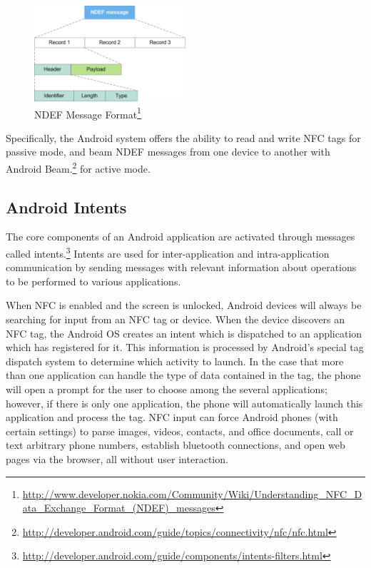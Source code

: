 \documentclass[12pt]{article}
\begin{document}
\begin{figure}[h!]
\begin{minipage}{\textwidth}
	\centering
		\includegraphics[width=0.5\textwidth]{NDEF_Format.png}
	\caption[Caption for LOF]%
		{NDEF Message Format\footnote{\url{http://www.developer.nokia.com/Community/Wiki/Understanding_NFC_Data_Exchange_Format_(NDEF)_messages}}}

\end{minipage} 
\end{figure}

Specifically, the Android system offers the ability to read and write NFC tags for passive mode, and beam NDEF messages from one device to another with Android Beam.\footnote{\url{http://developer.android.com/guide/topics/connectivity/nfc/nfc.html}} for active mode. 

\subsection{Android Intents}
The core components of an Android application are activated through messages called intents.\footnote{\url{http://developer.android.com/guide/components/intents-filters.html}}
Intents are used for inter-application and intra-application communication by sending messages with relevant information about operations to be performed to various applications.  

When NFC is enabled and the screen is unlocked, Android devices will always be searching for input from an NFC tag or device. 
When the device discovers an NFC tag, the Android OS creates an intent which is dispatched to an application which has registered for it.
This information is processed by Android's special tag dispatch system to determine which activity to launch.
In the case that more than one application can handle the type of data contained in the tag, the phone will open a prompt for the user to choose among the several applications; however, if there is only one application, the phone will automatically launch this application and process the tag.
NFC input can force Android phones (with certain settings) to parse images, videos, contacts, and office documents, call or text arbitrary phone numbers, establish bluetooth connections, and open web pages via the browser, all without user interaction.  
\end{document}
